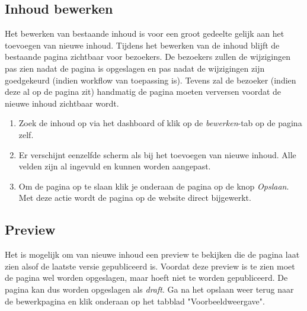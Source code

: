\subsection{Inhoud bewerken}
Het bewerken van bestaande inhoud is voor een groot gedeelte gelijk aan het toevoegen van nieuwe inhoud. Tijdens het bewerken van de inhoud blijft de bestaande pagina zichtbaar voor bezoekers. De bezoekers zullen de wijzigingen pas zien nadat de pagina is opgeslagen en pas nadat de wijzigingen zijn goedgekeurd (indien workflow van toepassing is). Tevens zal de bezoeker (indien deze al op de pagina zit) handmatig de pagina moeten verversen voordat de nieuwe inhoud zichtbaar wordt.
\begin{enumerate}
\item Zoek de inhoud op via het dashboard of klik op de \emph{bewerken}-tab op de pagina zelf.
\item Er verschijnt eenzelfde scherm als bij het toevoegen van nieuwe inhoud. Alle velden zijn al ingevuld en kunnen worden aangepast.
\item Om de pagina op te slaan klik je onderaan de pagina op de knop \emph{Opslaan}. Met deze actie wordt de pagina op de website direct bijgewerkt.
\end{enumerate}


\subsection{Preview}
Het is mogelijk om van nieuwe inhoud een preview te bekijken die de pagina laat zien alsof de laatste versie gepubliceerd is. Voordat deze preview is te zien moet de pagina wel worden opgeslagen, maar hoeft niet te worden gepubliceerd. De pagina kan dus worden opgeslagen als \emph{draft}. Ga na het opslaan weer terug naar de bewerkpagina en klik onderaan op het tabblad "Voorbeeldweergave".

